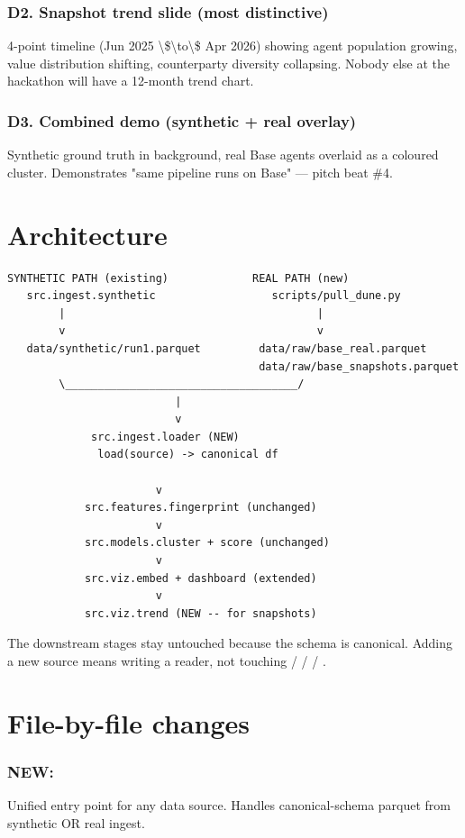 \documentclass[11pt]{article}
\begin{document}
\subsubsection*{D2. Snapshot trend slide (most distinctive)}
4-point timeline (Jun 2025 \textbackslash{}\$\textbackslash{}to\textbackslash{}\$ Apr 2026) showing agent population growing, value distribution shifting, counterparty diversity collapsing. Nobody else at the hackathon will have a 12-month trend chart.

\subsubsection*{D3. Combined demo (synthetic + real overlay)}
Synthetic ground truth in background, real Base agents overlaid as a coloured cluster. Demonstrates "same pipeline runs on Base" --- pitch beat \#4.

\section{Architecture}
\begin{lstlisting}
SYNTHETIC PATH (existing)             REAL PATH (new)
   src.ingest.synthetic                  scripts/pull_dune.py
        |                                       |
        v                                       v
   data/synthetic/run1.parquet         data/raw/base_real.parquet
                                       data/raw/base_snapshots.parquet
        \____________________________________/
                          |
                          v
             src.ingest.loader (NEW) 
              load(source) -> canonical df    
            
                       v
            src.features.fingerprint (unchanged)
                       v
            src.models.cluster + score (unchanged)
                       v
            src.viz.embed + dashboard (extended)
                       v
            src.viz.trend (NEW -- for snapshots)
\end{lstlisting}
The downstream stages stay untouched because the schema is canonical. Adding a new source means writing a reader, not touching  /  /  / .

\section{File-by-file changes}
\subsubsection*{NEW: }
Unified entry point for any data source. Handles canonical-schema parquet from synthetic OR real ingest.
\end{document}
